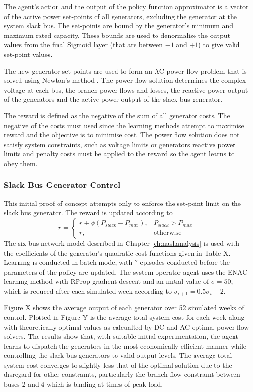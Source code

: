 The agent's action and the output of the policy function approximator is a
vector of the active power set-points of all generators, excluding the
generator at the system slack bus.  The set-points are bound by the generator's minimum
and maximum rated capacity. These bounds are used to denormalise the output
values from the final Sigmoid layer (that are between $-1$ and $+1$) to give
valid set-point values.

The new generator set-points are used to form an AC power flow problem that is
solved using Newton's method \cite{tinney:67}.  The power flow solution
determines the complex voltage at each bus, the branch power flows and losses,
the reactive power output of the generators and the active power output of the
slack bus generator.

The reward is defined as the negative of the sum of all generator costs.  The
negative of the costs must used since the learning methods attempt to maximise
reward and the objective is to minimise cost.  The power flow solution does not
satisfy system constraints, such as voltage limits or generators reactive power
limits and penalty costs must be applied to the reward so the agent learns to
obey them.

\subsubsection{Slack Bus Generator Control}
This initial proof of concept attempts only to enforce the set-point limit on
the slack bus generator.  The reward is updated according to
\begin{equation}
r =
\begin{cases}
r + \phi (P_{slack} - P_{max}), & \text{$P_{slack} > P_{max}$} \\
r, & \text{otherwise}
\end{cases}
\end{equation}
The six bus network model described in Chapter \ref{ch:nashanalysis} is used
with the coefficients of the generator's quadratic cost functions given in Table X.  Learning is conducted in batch
mode, with 7 episodes conducted before the parameters of the policy are
updated.  The system operator agent uses the ENAC learning method with RProp
gradient descent and an initial value of $\sigma = 50$, which is reduced after
each simulated week according to $\sigma_{i+1} = 0.5\sigma_i - 2$.

Figure X shows the average output of each generator over 52 simulated weeks of
control. Plotted in Figure Y is the average total system cost for each week along with
theoretically optimal values as calcualted by DC and AC optimal power flow
solvers.  The results show that, with suitable initial experimentation, the
agent learns to dispatch the generators in the most economically efficient
manner while controlling the slack bus generators to valid output levels.  The
average total system cost converges to slightly less that of the optimal
solution due to the disregard for other constraints, particularly the
branch flow constraint between buses 2 and 4 which is binding at times of peak
load.

